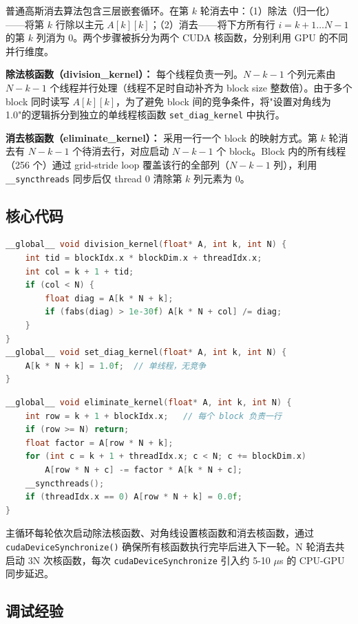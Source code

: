 \documentclass[a4paper]{article}
\begin{document}
普通高斯消去算法包含三层嵌套循环。在第 $k$ 轮消去中：（1）除法（归一化）——将第 $k$ 行除以主元 $A[k][k]$；（2）消去——将下方所有行 $i=k+1 \dots N-1$ 的第 $k$ 列消为 0。两个步骤被拆分为两个 CUDA 核函数，分别利用 GPU 的不同并行维度。

\textbf{除法核函数（division\_kernel）：} 每个线程负责一列。$N-k-1$ 个列元素由 $N-k-1$ 个线程并行处理（线程不足时自动补齐为 block size 整数倍）。由于多个 block 同时读写 $A[k][k]$，为了避免 block 间的竞争条件，将"设置对角线为 1.0"的逻辑拆分到独立的单线程核函数 \texttt{set\_diag\_kernel} 中执行。

\textbf{消去核函数（eliminate\_kernel）：} 采用一行一个 block 的映射方式。第 $k$ 轮消去有 $N-k-1$ 个待消去行，对应启动 $N-k-1$ 个 block。Block 内的所有线程（256 个）通过 grid-stride loop 覆盖该行的全部列（$N-k-1$ 列），利用 \texttt{\_\_syncthreads} 同步后仅 thread 0 清除第 $k$ 列元素为 0。

\subsection{核心代码}

\begin{lstlisting}[title=除法核函数与对角线设置,frame=trbl,language={C++}]
__global__ void division_kernel(float* A, int k, int N) {
    int tid = blockIdx.x * blockDim.x + threadIdx.x;
    int col = k + 1 + tid;
    if (col < N) {
        float diag = A[k * N + k];
        if (fabs(diag) > 1e-30f) A[k * N + col] /= diag;
    }
}
__global__ void set_diag_kernel(float* A, int k, int N) {
    A[k * N + k] = 1.0f;  // 单线程，无竞争
}
\end{lstlisting}

\begin{lstlisting}[title=消去核函数,frame=trbl,language={C++}]
__global__ void eliminate_kernel(float* A, int k, int N) {
    int row = k + 1 + blockIdx.x;   // 每个 block 负责一行
    if (row >= N) return;
    float factor = A[row * N + k];
    for (int c = k + 1 + threadIdx.x; c < N; c += blockDim.x)
        A[row * N + c] -= factor * A[k * N + c];
    __syncthreads();
    if (threadIdx.x == 0) A[row * N + k] = 0.0f;
}
\end{lstlisting}

主循环每轮依次启动除法核函数、对角线设置核函数和消去核函数，通过 \texttt{cudaDeviceSynchronize()} 确保所有核函数执行完毕后进入下一轮。N 轮消去共启动 3N 次核函数，每次 \texttt{cudaDeviceSynchronize} 引入约 5-10 $\mu$s 的 CPU-GPU 同步延迟。

\subsection{调试经验}
\end{document}
